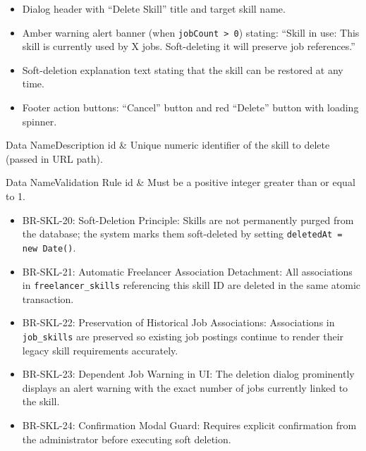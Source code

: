 \begin{itemize}[leftmargin=1.6em,topsep=3pt,itemsep=2pt,parsep=0pt,label=$\bullet$]
    \item Dialog header with ``Delete Skill'' title and target skill name.
    \item Amber warning alert banner (when \texttt{jobCount > 0}) stating: ``Skill in use: This skill is currently used by X jobs. Soft-deleting it will preserve job references.''
    \item Soft-deletion explanation text stating that the skill can be restored at any time.
    \item Footer action buttons: ``Cancel'' button and red ``Delete'' button with loading spinner.
\end{itemize}


\begin{specdatatable}{Data Name}{Description}
id & Unique numeric identifier of the skill to delete (passed in URL path).\\ \hline
\end{specdatatable}

\begin{specdatatable}{Data Name}{Validation Rule}
id & Must be a positive integer greater than or equal to 1.\\ \hline
\end{specdatatable}

\begin{itemize}[leftmargin=1.6em,topsep=3pt,itemsep=2pt,parsep=0pt,label=$\bullet$]\brrulelist
    \item BR-SKL-20: Soft-Deletion Principle: Skills are not permanently purged from the database; the system marks them soft-deleted by setting \texttt{deletedAt = new Date()}.
    \item BR-SKL-21: Automatic Freelancer Association Detachment: All associations in \texttt{freelancer\_skills} referencing this skill ID are deleted in the same atomic transaction.
    \item BR-SKL-22: Preservation of Historical Job Associations: Associations in \texttt{job\_skills} are preserved so existing job postings continue to render their legacy skill requirements accurately.
    \item BR-SKL-23: Dependent Job Warning in UI: The deletion dialog prominently displays an alert warning with the exact number of jobs currently linked to the skill.
    \item BR-SKL-24: Confirmation Modal Guard: Requires explicit confirmation from the administrator before executing soft deletion.
\end{itemize}

